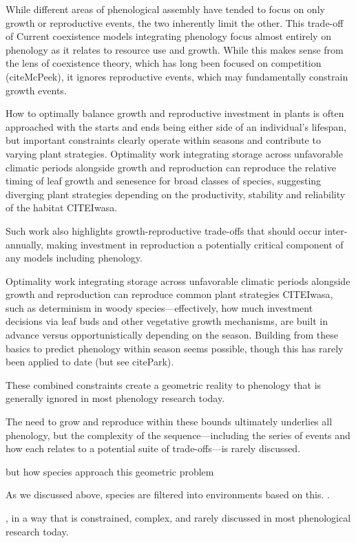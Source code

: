 \documentclass[11pt]{article}
\begin{document}
While different areas of phenological assembly have tended to focus on only growth or reproductive events, the two inherently limit the other. This trade-off of 
Current coexistence models integrating phenology focus almost entirely on phenology as it relates to resource use and growth. While this makes sense from the lens of coexistence theory, which has long been focused on competition (citeMcPeek), it ignores reproductive events, which may fundamentally constrain growth events. 

How to optimally balance growth and reproductive investment in plants is often approached with the starts and ends being either side of an individual's lifespan, but important constraints clearly operate within seasons and contribute to varying plant strategies. Optimality work integrating storage across unfavorable climatic periods alongside growth and reproduction can reproduce the relative timing of leaf growth and senesence for broad classes of species, suggesting diverging plant strategies depending on the productivity, stability and reliability of the habitat CITEIwasa. 

Such work also highlights growth-reproductive trade-offs that should occur inter-annually, making investment in reproduction a potentially critical component of any models including phenology. 

Optimality work integrating storage across unfavorable climatic periods alongside growth and reproduction can reproduce common plant strategies CITEIwasa, such as determinism in woody species---effectively, how much investment decisions via leaf buds and other vegetative growth mechanisms, are built in advance versus opportunistically depending on the season. Building from these basics to predict phenology within season seems possible, though this has rarely been applied to date (but see citePark). 

These combined constraints create a geometric reality to phenology that is generally ignored in most phenology research today. 

The need to grow and reproduce within these bounds ultimately underlies all phenology, but the complexity of the sequence---including the series of events and how each relates to a potential suite of trade-offs---is rarely discussed. 

but how species approach this geometric problem 

As we discussed above, species are filtered into environments based on this. 
. 

, in a way that is constrained, complex, and rarely discussed in most phenological research today.  
\end{document}
